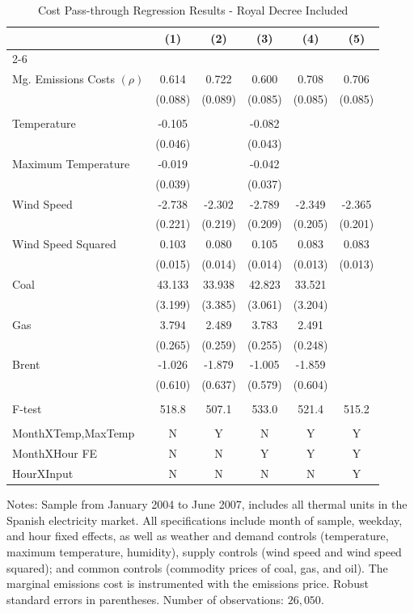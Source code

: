 \begin{table}
\centering
\caption{Cost Pass-through Regression Results - Royal Decree Included} \label{tab:cost_pt_rd}

\begin{tabular*}{.9\textwidth}{@{\extracolsep{\fill}} l  c  c  c  c  c }
\hline\hline 
 & \textbf{(1)}  & \textbf{(2)}  & \textbf{(3)}  & \textbf{(4)}  & \textbf{(5)} \\ \cline{2-6} \\[-\sep]
Mg. Emissions Costs $(\rho)$  & 0.614 & 0.722 & 0.600 & 0.708 & 0.706 \\ 
 & (0.088) & (0.089) & (0.085) & (0.085) & (0.085) \\[\sep] \hline \\[-\sep]
Temperature  & -0.105 & & -0.082 & & \\ 
 & (0.046) & & (0.043) & & \\[\sep] 
Maximum Temperature  & -0.019 & & -0.042 & & \\ 
 & (0.039) & & (0.037) & & \\[\sep] 
Wind Speed  & -2.738 & -2.302 & -2.789 & -2.349 & -2.365 \\ 
 & (0.221) & (0.219) & (0.209) & (0.205) & (0.201) \\[\sep] 
Wind Speed Squared & 0.103 & 0.080 & 0.105 & 0.083 & 0.083 \\ 
 & (0.015) & (0.014) & (0.014) & (0.013) & (0.013) \\[\sep] 
Coal  & 43.133 & 33.938 & 42.823 & 33.521 \\ 
 & (3.199) & (3.385) & (3.061) & (3.204) \\[\sep] 
Gas  & 3.794 & 2.489 & 3.783 & 2.491 \\ 
 & (0.265) & (0.259) & (0.255) & (0.248) \\[\sep] 
Brent  & -1.026 & -1.879 & -1.005 & -1.859 \\ 
 & (0.610) & (0.637) & (0.579) & (0.604) \\[\sep]\hline\\[-\sep]
 F-test 
 & 518.8  & 507.1  & 533.0  & 521.4  & 515.2  \\[\sep]\hline\\[-\sep]
MonthXTemp,MaxTemp     & N & Y & N & Y & Y  \\
MonthXHour FE          & N & N & Y & Y & Y  \\
HourXInput                     & N & N & N & N & Y  \\[\sep]
\hline\hline 
\end{tabular*}
\begin{minipage}[c]{.9\textwidth}
{\footnotesize 
\noindent
Notes: Sample from January 2004 to June 2007, includes all thermal units in the Spanish electricity market. 
All specifications include month of sample, weekday, and hour fixed effects, as well as weather and demand controls 
(temperature, maximum temperature, humidity), 
 supply controls (wind speed and wind speed squared); and common controls (commodity prices of 
coal, gas, and oil). The marginal emissions cost is instrumented with the emissions price. 
Robust standard errors in parentheses. Number of observations: $ 26,050$.}
\end{minipage}
\end{table}

